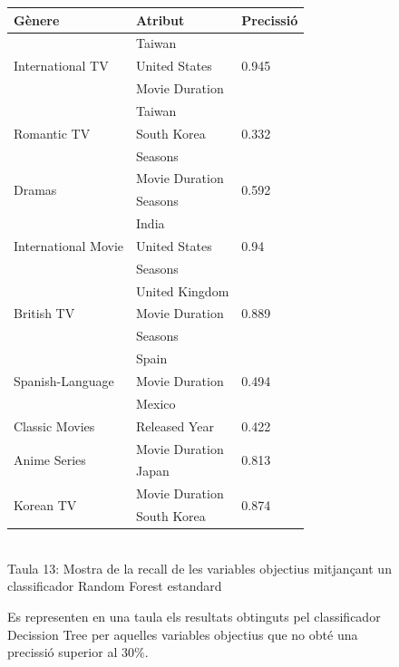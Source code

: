 \documentclass[a4paper, 11pt]{article}
\begin{document}
\begin{figure}[h]
\begin{minipage}{5cm}
\begin{center}
\end{center}
\end{minipage} %
\hspace{2em}
\begin{minipage}{9cm} %
\begin{center}
    \begin{tabular}{l|l|l}
        \textbf{Gènere} & \textbf{Atribut} & \textbf{Precissió}\\\hline\hline
            \multirow{3}{*}{International TV} &  Taiwan & \multirow{3}{*}{0.945} \\
            & United States & \\
            & Movie Duration& \\ \hline
        \multirow{3}{*}{Romantic TV} &  Taiwan & \multirow{3}{*}{0.332} \\
            & South Korea & \\
            & Seasons & \\ \hline
        \multirow{2}{*}{Dramas} &  Movie Duration & \multirow{2}{*}{0.592} \\
        & Seasons & \\\hline
        \multirow{3}{*}{International Movie} &  India & \multirow{3}{*}{0.94} \\
            & United States & \\
            & Seasons & \\ \hline
        \multirow{3}{*}{British TV} &  United Kingdom & \multirow{3}{*}{0.889} \\
            & Movie Duration & \\
            & Seasons & \\ \hline
        \multirow{3}{*}{Spanish-Language} &  Spain & \multirow{3}{*}{0.494} \\
            & Movie Duration & \\
            & Mexico & \\ \hline
        Classic Movies & Released Year & 0.422 \\ \hline 
        \multirow{2}{*}{Anime Series} & Movie Duration & \multirow{2}{*}{0.813}\\
        & Japan & \\ \hline
        \multirow{2}{*}{Korean TV} & Movie Duration & \multirow{2}{*}{0.874}\\
        & South Korea & \\ 
        
    \end{tabular}
    \label{tab:afins}
    \\
    Taula 13: Mostra de la recall de les variables objectius mitjançant un classificador Random Forest estandard   \setcounter{table}{13}
\end{center}
Es representen en una taula els resultats obtinguts pel classificador Decission Tree per aquelles variables objectius que no obté una precissió superior al $30\%$.
\end{minipage} %
\end{figure} %
\end{document}
